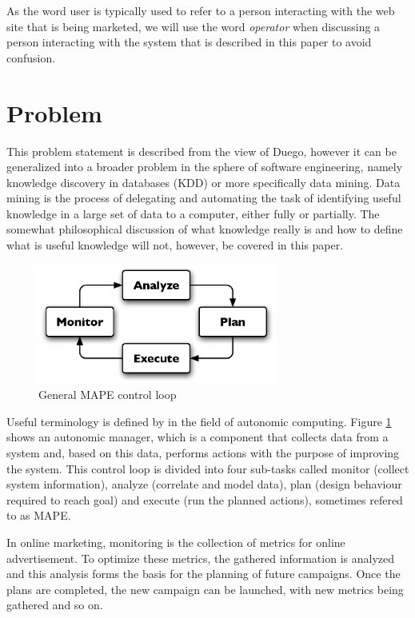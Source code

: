 \documentclass[a4paper]{article}
\begin{document}
As the word user is typically used to refer to a person interacting with the web site that is being marketed, we will use the word
\emph{operator} when discussing a person interacting with the system that is described in this paper to avoid confusion.

\section{Problem}
This problem statement is described from the view of Duego, however it can be generalized into a broader problem in the sphere of
software engineering, namely knowledge discovery in databases (KDD) or more specifically data mining. Data mining is the process
of delegating and automating the task of identifying useful knowledge in a large set of data to a computer, either fully or
partially. The somewhat philosophical discussion of what knowledge really is and how to define what is useful knowledge will not,
however, be covered in this paper.

\begin{figure}[htb]
\centering
\includegraphics[width=0.7\textwidth]{mape.eps}
\caption{General MAPE control loop}
\label{fig:MAPE}
\end{figure}

Useful terminology is defined by \citet{IBM2006} in the field of autonomic computing. Figure \ref{fig:MAPE} shows an autonomic
manager, which is a component that collects data from a system and, based on this data, performs actions with the purpose of
improving the system. This control loop is divided into four sub-tasks called monitor (collect system information), analyze
(correlate and model data), plan (design behaviour required to reach goal) and execute (run the planned actions), sometimes
refered to as MAPE.

In online marketing, monitoring is the collection of metrics for online advertisement. To optimize these metrics, the gathered
information is analyzed and this analysis forms the basis for the planning of future campaigns. Once the plans are completed, the
new campaign can be launched, with new metrics being gathered and so on.
\end{document}
